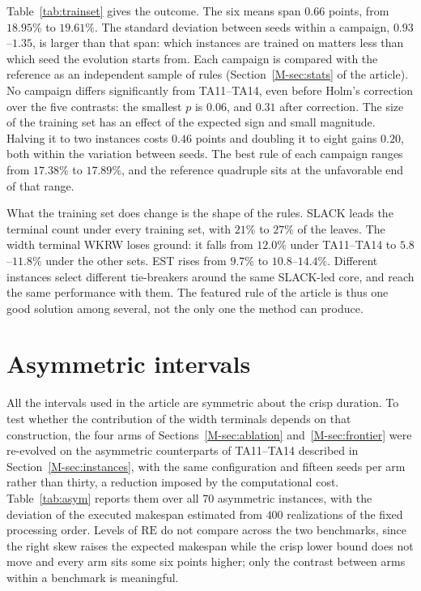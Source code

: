 \documentclass[11pt]{article}
\newcommand{\RE}{\mathrm{RE}}
\begin{document}
Table~\ref{tab:trainset} gives the outcome. The six means span $0.66$
points, from $18.95\%$ to $19.61\%$. The standard deviation between
seeds within a campaign, $0.93$--$1.35$, is larger than that span:
which instances are trained on matters less than which seed the
evolution starts from. Each campaign is compared with the reference as
an independent sample of rules (Section~\ref{M-sec:stats} of the
article). No campaign differs significantly from TA11--TA14, even before
Holm's correction over the five contrasts: the smallest $p$ is
$0.06$, and $0.31$ after correction. The size of the training set has
an effect of the expected sign and small magnitude. Halving it to two
instances costs $0.46$ points and doubling it to eight gains $0.20$,
both within the variation between seeds. The best rule of each campaign
ranges from $17.38\%$ to $17.89\%$, and the reference quadruple sits at
the unfavorable end of that range.

What the training set does change is the shape of the rules. SLACK
leads the terminal count under every training set, with $21\%$ to
$27\%$ of the leaves. The width terminal WKRW loses ground: it falls
from $12.0\%$ under TA11--TA14 to $5.8$--$11.8\%$ under the other
sets. EST rises from $9.7\%$ to
$10.8$--$14.4\%$. Different instances select different tie-breakers
around the same SLACK-led core, and reach the same performance with
them. The featured rule of the article is thus one good solution among
several, not the only one the method can produce.

\section{Asymmetric intervals}
\label{sec:asym}

All the intervals used in the article are symmetric about the crisp
duration. To test whether the contribution of the width terminals
depends on that construction, the four arms of
Sections~\ref{M-sec:ablation} and~\ref{M-sec:frontier} were
re-evolved on the asymmetric counterparts of TA11--TA14 described in
Section~\ref{M-sec:instances}, with the same configuration and fifteen
seeds per arm rather than thirty, a reduction imposed by the computational cost. Table~\ref{tab:asym} reports them over all 70 asymmetric
instances, with the deviation of the executed makespan estimated from $400$ realizations
of the fixed processing order. Levels of $\RE$ do not compare across the
two benchmarks, since the right skew raises the expected makespan while
the crisp lower bound does not move and every arm sits some six points
higher; only the contrast between arms within a benchmark is meaningful.
\end{document}
